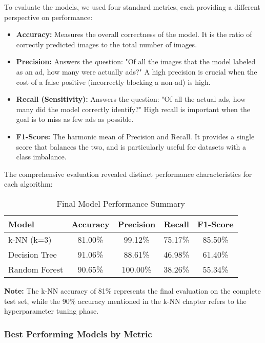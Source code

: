 To evaluate the models, we used four standard metrics, each providing a different perspective on performance:
\begin{itemize}
    \item \textbf{Accuracy:} Measures the overall correctness of the model. It is the ratio of correctly predicted images to the total number of images.
    \item \textbf{Precision:} Answers the question: "Of all the images that the model labeled as an ad, how many were actually ads?" A high precision is crucial when the cost of a false positive (incorrectly blocking a non-ad) is high.
    \item \textbf{Recall (Sensitivity):} Answers the question: "Of all the actual ads, how many did the model correctly identify?" High recall is important when the goal is to miss as few ads as possible.
    \item \textbf{F1-Score:} The harmonic mean of Precision and Recall. It provides a single score that balances the two, and is particularly useful for datasets with a class imbalance.
\end{itemize}

The comprehensive evaluation revealed distinct performance characteristics for each algorithm:

\begin{table}[h]
\centering
\caption{Final Model Performance Summary}
\label{tab:final_performance}
\begin{tabular}{|l|c|c|c|c|}
\hline
\textbf{Model} & \textbf{Accuracy} & \textbf{Precision} & \textbf{Recall} & \textbf{F1-Score} \\
\hline
k-NN (k=3) & 81.00\% & 99.12\% & 75.17\% & 85.50\% \\
Decision Tree & 91.06\% & 88.61\% & 46.98\% & 61.40\% \\
Random Forest & 90.65\% & 100.00\% & 38.26\% & 55.34\% \\
\hline
\end{tabular}
\end{table}

\textbf{Note:} The k-NN accuracy of 81\% represents the final evaluation on the complete test set, while the 90\% accuracy mentioned in the k-NN chapter refers to the hyperparameter tuning phase.

\subsubsection{Best Performing Models by Metric}

